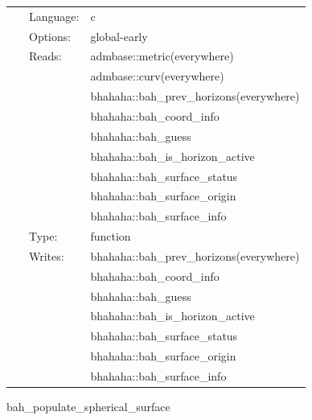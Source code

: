\documentclass[a4paper,11pt]{article}
\begin{document}
 \begin{tabular*}{160mm}{cll} 
~ & Language:  & c \\ 
~ & Options:  & global-early \\ 
~ & Reads:  & admbase::metric(everywhere) \\ 
~& ~ &admbase::curv(everywhere)\\ 
~& ~ &bhahaha::bah\_prev\_horizons(everywhere)\\ 
~& ~ &bhahaha::bah\_coord\_info\\ 
~& ~ &bhahaha::bah\_guess\\ 
~& ~ &bhahaha::bah\_is\_horizon\_active\\ 
~& ~ &bhahaha::bah\_surface\_status\\ 
~& ~ &bhahaha::bah\_surface\_origin\\ 
~& ~ &bhahaha::bah\_surface\_info\\ 
~ & Type:  & function \\ 
~ & Writes:  & bhahaha::bah\_prev\_horizons(everywhere) \\ 
~& ~ &bhahaha::bah\_coord\_info\\ 
~& ~ &bhahaha::bah\_guess\\ 
~& ~ &bhahaha::bah\_is\_horizon\_active\\ 
~& ~ &bhahaha::bah\_surface\_status\\ 
~& ~ &bhahaha::bah\_surface\_origin\\ 
~& ~ &bhahaha::bah\_surface\_info\\ 
\end{tabular*} 


\vspace{5mm}


\hspace{5mm} bah\_populate\_spherical\_surface 

\hspace{5mm}{\it populate sphericalsurface with bhahaha horizon data } 


\hspace{5mm}
\end{document}
